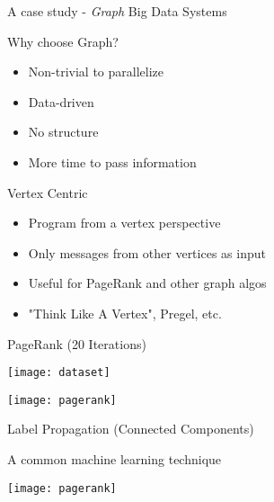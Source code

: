 \begin{frame}[t]{A case study - \textit{Graph} Big Data Systems}

  \vspace{0.5cm}

  Why choose Graph?

  \begin{itemize}
    \item Non-trivial to parallelize
    \item Data-driven
    \item No structure
    \item More time to pass information
  \end{itemize}

  \vspace{0.5cm}

  \pause

  Vertex Centric

  \begin{itemize}
    \item Program from a vertex perspective
    \item Only messages from other vertices as input
    \item Useful for PageRank and other graph algos
    \item "Think Like A Vertex", Pregel, etc.
  \end{itemize}

  \vspace{0.5cm}
\end{frame}

\begin{frame}[t]{PageRank (20 Iterations)}
  \begin{center}
    \texttt{[image: dataset]}
  \end{center}
  
  \vspace{0.5cm}

  \begin{center}
    \texttt{[image: pagerank]}
  \end{center}
\end{frame}

\begin{frame}{Label Propagation (Connected Components)}

  \vspace{0.25cm}

  A common machine learning technique

  \vspace{0.5cm}

  \begin{center}
    \texttt{[image: pagerank]}
  \end{center}
\end{frame}